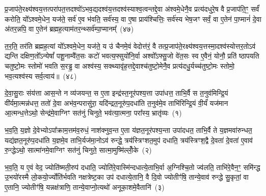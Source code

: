 {\anuvakamend[{अभ॑व॒न्नायु॑रे॒वर्त॒व्या॑ उप॒ षड्विꣳ॑शतिश्च}]}%

प्र॒जाप॑ते॒रक्ष्य॑श्वय॒त्तत्परा॑पत॒त्तदश्वो॑\-ऽभव॒द्यदश्व॑य॒त्तदश्व॑स्याश्व॒त्वन्तद्दे॒वा अ॑श्वमे॒धेनै॒व प्रत्य॑दधुरे॒ष वै प्र॒जाप॑ति॒ꣳ॒ सर्वं॑ करोति॒ यो᳚\-ऽश्वमे॒धेन॒ यज॑ते॒ सर्व॑ ए॒व भ॑वति॒ सर्व॑स्य॒ वा ए॒षा प्राय॑श्चित्तिः॒ सर्व॑स्य भेष॒जꣳ सर्वं॒ वा ए॒तेन॑ पा॒प्मानं॑ दे॒वा अ॑तर॒न्नपि॒ वा ए॒तेन॑ ब्रह्मह॒त्याम॑तर॒न्थ्सर्व॑म्पा॒प्मानम्᳚~(४७)

त॒र॒ति॒ तर॑ति ब्रह्मह॒त्यां यो᳚\-ऽश्वमे॒धेन॒ यज॑ते॒ य उ॑ चैनमे॒वं वेदोत्त॑रं॒ वै तत्प्र॒जाप॑ते॒रक्ष्य॑श्वय॒त्तस्मा॒दश्व॑स्योत्तर॒तो\-ऽव॑ द्यन्ति दक्षिण॒तो᳚\-ऽन्येषां᳚ पशू॒नाम्वै॑त॒सः कटो॑ भवत्य॒फ्सुयो॑नि॒र्वा अश्वो᳚\-ऽफ्सु॒जो वे॑त॒सः स्व ए॒वैनं॒ योनौ॒ प्रति॑ ष्ठापयति चतुष्टो॒मः स्तोमो॑ भवति स॒रड्ढ॒ वा अश्व॑स्य॒ सक्थ्यावृ॑ह॒त्तद्दे॒वाश्च॑तुष्टो॒मेनै॒व प्रत्य॑दधु॒र्यच्च॑तुष्टो॒मः स्तोमो॒ भव॒त्यश्व॑स्य सर्व॒त्वाय॑॥~(४८)

{\anuvakamend[{सर्वं॑ पा॒प्मान॑मवृह॒द्द्वाद॑श च}]}%


{\anuvakamend[{दे॒वा॒सु॒राः तेनर्त॒व्या॑ रु॒द्रो\-ऽश्म॑न्नृ॒षदे॒ वडुदे॑नं॒ प्राची॒मिति॒ वसो॒र्धारा॑म॒ग्निर्दे॒वेभ्यः॑ सुव॒र्गाय॑ यत्राकू॒ताय॑ छन्द॒श्चितं॒ पव॑स्व॒ द्वाद॑श}]}%

\setcounter{anuvakam}{0}
दे॒वा॒सु॒राः संय॑त्ता आस॒न्ते न व्य॑जयन्त॒ स ए॒ता इन्द्र॑स्त॒नूर॑पश्य॒त्ता उपा॑धत्त॒ ताभि॒र्वै स त॒नुव॑मिन्द्रि॒यं वी॑र्यमा॒त्मन्न॑धत्त॒ ततो॑ दे॒वा अभ॑व॒न्परासु॑रा॒ यदि॑न्द्रत॒नूरु॑प॒दधा॑ति त॒नुव॑मे॒व ताभि॑रिन्द्रि॒यं वी॒र्यं॑ यज॑मान आ॒त्मन्ध॒त्ते\-ऽथो॒ सेन्द्र॑मे॒वाग्निꣳ सत॑नुं चिनुते॒ भव॑त्या॒त्मना॒ परा᳚स्य॒ भ्रातृ॑व्यः~(१)

भ॒व॒ति॒ य॒ज्ञो दे॒वेभ्यो\-ऽपा᳚क्राम॒त्तम॑व॒रुधं॒ नाश॑क्नुव॒न्त ए॒ता य॑ज्ञत॒नूर॑पश्य॒न्ता उपा॑दधत॒ ताभि॒र्वै ते य॒ज्ञमवा॑रुन्धत॒ यद्य॑ज्ञत॒नूरु॑प॒दधा॑ति य॒ज्ञमे॒व ताभि॒र्यज॑मा॒नो\-ऽव॑ रुन्द्धे॒ त्रय॑स्त्रिꣳशत॒मुप॑ दधाति॒ त्रय॑स्त्रिꣳश॒द्वै दे॒वता॑ दे॒वता॑ ए॒वाव॑ रु॒न्द्धे\-ऽथो॒ सात्मा॑नमे॒वाग्निꣳ सत॑नुं चिनुते॒ सात्मा॒मुष्मि॑ल्लोँ॒के~(२)

भ॒व॒ति॒ य ए॒वं वेद॒ ज्योति॑ष्मती॒रुप॑ दधाति॒ ज्योति॑रे॒वास्मि॑न्दधात्ये॒ताभि॒र्वा अ॒ग्निश्चि॒तो ज्व॑लति॒ ताभि॑रे॒वैन॒ꣳ॒ समि॑न्द्ध उ॒भयो॑रस्मै लो॒कयो॒र्ज्योति॑र्भवति नक्षत्रेष्ट॒का उप॑ दधात्ये॒तानि॒ वै दि॒वो ज्योतीꣳ॑षि॒ तान्ये॒वाव॑ रुन्द्धे सु॒कृतां॒ वा ए॒तानि॒ ज्योतीꣳ॑षि॒ यन्नक्ष॑त्राणि॒ तान्ये॒वाप्नो॒त्यथो॑ अनूका॒शमे॒वैतानि॑~(३)

